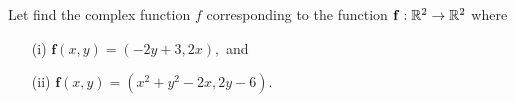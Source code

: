 \begin{comment}
\begin{example} Let us find the corresponding complex function, $f:{\mathbb C} \rightarrow {\mathbb C}$, for the function
\begin{equation*}
\mathbf{f} : \R^2 \to \R^2, (x,y) \mapsto (2y,-x)
\end{equation*}
and express it in terms of $z \in \C$.
\end{example}

\begin{solution}
The corresponding function $f:\C \to \C$ is given by
\begin{align*}
f(z)= f(x+iy)&=2y+i(-x) \\
& = 2 \Im (z) +i ( - \Re (z) ) \\
& = 2 \left( \frac{z-\overline{z}}{2i} \right)-i \left( \frac{z+\overline{z}}{2} \right) \\
&=\frac{-3i z}{2}+\frac{i\overline{z}}{2}.
\end{align*}

Thus the corresponding complex function is
\begin{equation*}
f: \C \to \C, \ f(z)= \frac{-3i z}{2}+\frac{i\overline{z}}{2}.
\end{equation*}
(Here we have used the identities $\Re (z) = \frac{1}{2} (z+\conj{z})$ and $\Im (z) = \frac{1}{2i}(z-\conj{z})$, together with the fact that $i^{-1}=-i$)
\end{solution}
\end{comment}




\begin{example}
Let find the complex function $f$ corresponding to the function $\mathbf{f}:\mathbb{R}^2 \to \mathbb{R}^2$ where
\begin{enumerate}
\item[(i)] $\mathbf{f} (x,y) = (-2y+3,2x),$ and
\item[(ii)] $\mathbf{f}(x,y) = (x^2+y^2-2x,2y-6)$.
\end{enumerate}

\end{example}

